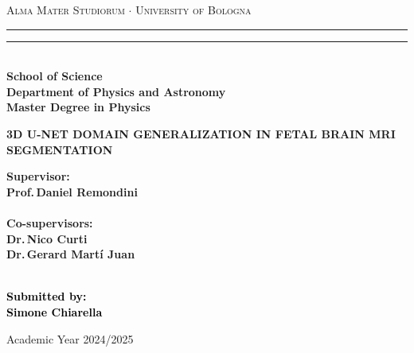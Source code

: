 \documentclass[12pt,a4paper]{report}
\begin{document}
\begin{titlepage}
%
%
%
%
\begin{center}
{{\Large{\textsc{Alma Mater Studiorum $\cdot$ University of  Bologna}}}} 
\rule[0.1cm]{15.8cm}{0.1mm}
\rule[0.5cm]{15.8cm}{0.6mm}
\\\vspace{3mm}
{\small{\bfseries School of Science \\
Department of Physics and Astronomy\\
Master Degree in Physics}}
\end{center}

\vspace{23mm}

\begin{center}
%
%
\begin{spacing}{2}
{\LARGE{\bfseries 3D U-NET DOMAIN GENERALIZATION IN FETAL BRAIN MRI SEGMENTATION}}\\
\end{spacing}
\end{center}

\vspace{35mm} \par \noindent

\begin{minipage}[t]{0.47\textwidth}
%
%
{\large{\bfseries Supervisor: \vspace{2mm}\\{
Prof.\,Daniel Remondini}\\\\
%
%
%
\bfseries Co-supervisors:
\vspace{2mm}\\
Dr.\,Nico Curti\\
Dr.\,Gerard Martí Juan\\\\}}
\end{minipage}
%
\hfill
%
\begin{minipage}[t]{0.47\textwidth}\raggedleft \textcolor{black}{
{\large{\bfseries Submitted by:
\vspace{2mm}\\
%
%
Simone Chiarella}}}

\end{minipage}

\vspace{20mm}

\begin{center}
%
%
Academic Year 2024/2025
\end{center}

\end{titlepage}
\end{document}
